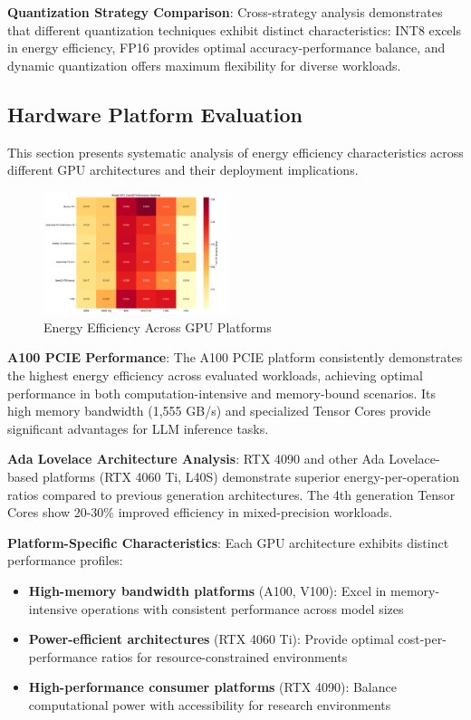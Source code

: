 \documentclass[sigconf]{acmart}
\begin{document}
\textbf{Quantization Strategy Comparison}: Cross-strategy analysis demonstrates that different quantization techniques exhibit distinct characteristics: INT8 excels in energy efficiency, FP16 provides optimal accuracy-performance balance, and dynamic quantization offers maximum flexibility for diverse workloads.

\subsection{Hardware Platform Evaluation}

This section presents systematic analysis of energy efficiency characteristics across different GPU architectures and their deployment implications.

\begin{figure}[h]
\centering
\includegraphics[width=0.48\textwidth]{img/overall_performance_heatmap.png}
\caption{Energy Efficiency Across GPU Platforms}
\label{fig:heatmap}
\end{figure}

\textbf{A100 PCIE Performance}: The A100 PCIE platform consistently demonstrates the highest energy efficiency across evaluated workloads, achieving optimal performance in both computation-intensive and memory-bound scenarios. Its high memory bandwidth (1,555 GB/s) and specialized Tensor Cores provide significant advantages for LLM inference tasks.

\textbf{Ada Lovelace Architecture Analysis}: RTX 4090 and other Ada Lovelace-based platforms (RTX 4060 Ti, L40S) demonstrate superior energy-per-operation ratios compared to previous generation architectures. The 4th generation Tensor Cores show 20-30\% improved efficiency in mixed-precision workloads.

\textbf{Platform-Specific Characteristics}: Each GPU architecture exhibits distinct performance profiles:
\begin{itemize}
\item \textbf{High-memory bandwidth platforms} (A100, V100): Excel in memory-intensive operations with consistent performance across model sizes
\item \textbf{Power-efficient architectures} (RTX 4060 Ti): Provide optimal cost-per-performance ratios for resource-constrained environments
\item \textbf{High-performance consumer platforms} (RTX 4090): Balance computational power with accessibility for research environments
\end{itemize}
\end{document}
